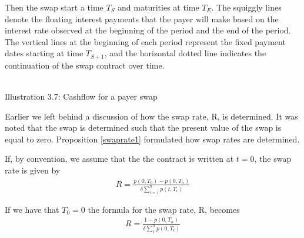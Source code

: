 Then the swap start a time $T_S$ and maturities at time $T_E$.
The squiggly lines denote the floating interest payments that the payer will make based on the interest rate observed 
at the beginning of the period and the end of the period. The vertical lines at the beginning of each period represent
the fixed payment dates starting at time $T_{S+1}$, and the horizontal dotted line indicates the continuation of the swap contract over time.
\begin{center}
    \\[10pt] 
    Illustration 3.7: Cashflow for a payer swap 
\end{center}
Earlier we left behind a discussion of how the swap rate, R,  is determined. 
It was noted that the swap is determined such that the present value of
the swap is equal to zero. 
Proposition \ref{swaprate1} formulated how swap rates are determined.
\begin{proposition}
    If, by convention, we assume that the the contract is written at $t=0$, 
    the swap rate is given by \cite{Bjork}
    \begin{align*}
        R = \frac{p(0,T_0)-p(0,T_n)}{\delta \sum_{i=1}^{n}p(t,T_i)}
    \end{align*} 
    \label{swaprate1}
\end{proposition}
\noindent 
If we have that $T_0=0$ the formula for the swap rate, R, becomes
\begin{align*}
    R= \frac{1-p(0,T_n)}{\delta \sum_{1}^{n}p(0,T_i)}
\end{align*}
\newpage
